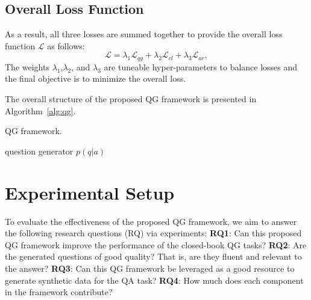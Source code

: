 \documentclass[11pt]{article}
\begin{document}
\subsection{Overall Loss Function}
As a result, all three losses are summed together to provide the overall loss function $\mathcal{L}$ as follows:
\begin{equation}\label{eq:total}
    \mathcal{L} = \lambda_{1} \mathcal{L}_{qg} + \lambda_{2}\mathcal{L}_{cl} + \lambda_{3}\mathcal{L}_{ar},
\end{equation}
The weights $\lambda_{1}$,$\lambda_{2}$, and $\lambda_{3}$ are tuneable hyper-parameters to balance losses and the final objective is to minimize the overall loss.

The overall structure of the proposed QG framework is presented in Algorithm~\ref{alg:qg}. 


\begin{algorithm}[htbp!]
\caption{QG framework.}
\label{alg:qg}
\Return question generator $p(q|a)$
\end{algorithm}
\vspace{-0.3cm}
\section{Experimental Setup}

To evaluate the effectiveness of the proposed QG framework, we aim to answer the following research questions (RQ) via experiments: \textbf{RQ1}: Can this proposed QG framework improve the performance of the closed-book QG tasks? \textbf{RQ2}: Are the generated questions of good quality? That is, are they fluent and relevant to the answer? \textbf{RQ3}: Can this QG framework be leveraged as a good resource to generate synthetic data for the QA task? \textbf{RQ4}: How much does each component in the framework contribute?
\end{document}
